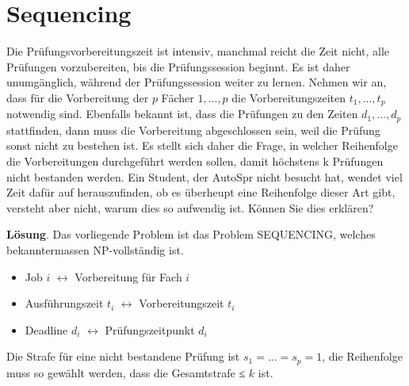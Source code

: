\section{Sequencing}

Die Prüfungsvorbereitungszeit ist intensiv, manchmal reicht die Zeit nicht, alle Prüfungen vorzubereiten, bis die Prüfungssession beginnt. Es ist daher unumgänglich, während der Prüfungssession weiter zu lernen. Nehmen wir an, dass für die Vorbereitung der $p$ Fächer $1,..., p$ die Vorbereitungszeiten $t_1 , ... , t_p$ notwendig sind. Ebenfalls bekannt ist, dass die Prüfungen zu den Zeiten $d_1 , . . . , d_p$ stattfinden, dann muss die Vorbereitung abgeschlossen sein, weil die Prüfung sonst nicht zu bestehen ist. Es stellt sich daher die Frage, in welcher Reihenfolge die Vorbereitungen durchgeführt werden sollen, damit höchstens k Prüfungen nicht bestanden werden. Ein Student, der AutoSpr nicht besucht hat, wendet viel Zeit dafür auf herauszufinden, ob es überheupt eine Reihenfolge dieser Art gibt, versteht aber nicht, warum dies so aufwendig ist. Können Sie dies erklären?

\textbf{Lösung}. Das vorliegende Problem ist das Problem SEQUENCING, welches bekanntermassen
NP-vollständig ist.

\begin{itemize}
\item Job $i$ $\leftrightarrow$ Vorbereitung für Fach $i$
\item Ausführungszeit $t_i$ $\leftrightarrow$ Vorbereitungszeit $t_i$
\item Deadline $d_i$ $\leftrightarrow$ Prüfungszeitpunkt $d_i$
\end{itemize}


Die Strafe für eine nicht bestandene Prüfung ist $s_1 = . . .= s_p = 1$, die Reihenfolge muss so gewählt werden, dass die Gesamtstrafe ≤ $k$ ist.